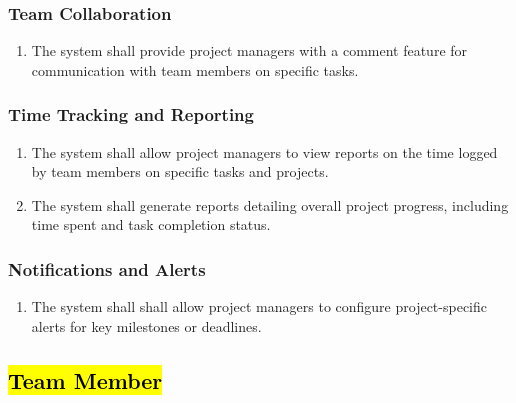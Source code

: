 \documentclass[]{article}
\begin{document}
            \subsubsection{Team Collaboration}
            \begin{enumerate}[label=\scriptsize\textbf{\textcolor{gray}{FR-PM-\arabic{pmCounter}}}, leftmargin=*, itemsep=-4px]
                \item The system shall provide project managers with a comment feature for communication with team members on specific tasks.
            \end{enumerate}
                    
            \subsubsection{Time Tracking and Reporting}
            \begin{enumerate}[label=\scriptsize\textbf{\textcolor{gray}{FR-PM-\arabic{pmCounter}}}, leftmargin=*, itemsep=-4px]
               \item The system shall allow project managers to view reports on the time logged by team members on specific tasks and projects.
               \item The system shall generate reports detailing overall project progress, including time spent and task completion status.
            \end{enumerate}

            \subsubsection{Notifications and Alerts}
            \begin{enumerate}[label=\scriptsize\textbf{\textcolor{gray}{FR-PM-\arabic{pmCounter}}}, leftmargin=*, itemsep=-4px]
                \item The system shall shall allow project managers to configure project-specific alerts for key milestones or deadlines.
            \end{enumerate}

        \subsection{\hl{Team Member}}
\end{document}
